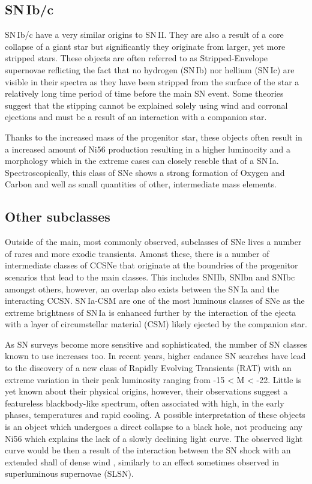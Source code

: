 \subsection{SN\,Ib/c}
SN\,Ib/c have a very similar origins to SN\,II. They are also a result of a core collapse of a giant star but significantly they originate from larger, yet more stripped stars. These objects are often referred to as Stripped-Envelope supernovae reflicting the fact that no hydrogen (SN\,Ib) nor hellium (SN\,Ic) are visible in their spectra as they have been stripped from the surface of the star a relatively long time period of time before the main SN event. Some theories suggest that the stipping cannot be explained solely using wind and corronal ejections and must be a result of an interaction with a companion star.

Thanks to the increased mass of the progenitor star, these objects often result in a increased amount of Ni56 production resulting in a higher luminocity and a morphology which in the extreme cases can closely reseble that of a SN\,Ia. Spectroscopically, this class of SNe shows a strong formation of Oxygen and Carbon and well as small quantities of other, intermediate mass elements.

\subsection{Other subclasses}
Outside of the main, most commonly observed, subclasses of SNe lives a number of rares and more exodic transients. Amonst these, there is a number of intermediate classes of CCSNe that originate at the boundries of the progenitor scenarios that lead to the main classes. This includes SNIIb, SNIbn and SNIbc amongst others, however, an overlap also exists between the SN\,Ia and the interacting CCSN. SN\,Ia-CSM are one of the most luminous classes of SNe as the extreme brightness of SN\,Ia is enhanced further by the interaction of the ejecta with a layer of circumstellar material (CSM) likely ejected by the companion star.

As SN surveys become more sensitive and sophisticated,  the number of SN classes known to use increases too. In recent years, higher cadance SN searches have lead to the discovery of a new class of Rapidly Evolving Transients (RAT) with an extreme variation in their peak luminosity ranging from -15 < M < -22. Little is yet known about their physical origins, however, their observations suggest a featureless blackbody-like spectrum, often associated with high, in the early phases, temperatures and rapid cooling. A possible interpretation of these objects is an object which undergoes a direct collapse to a black hole, not producing any Ni56 which explains the lack of a slowly declining light curve. The observed light curve would be then a result of the interaction between the SN shock with an extended shall of dense wind \citep{Piro2015}, similarly to an effect sometimes observed in superluminous supernovae (SLSN).

